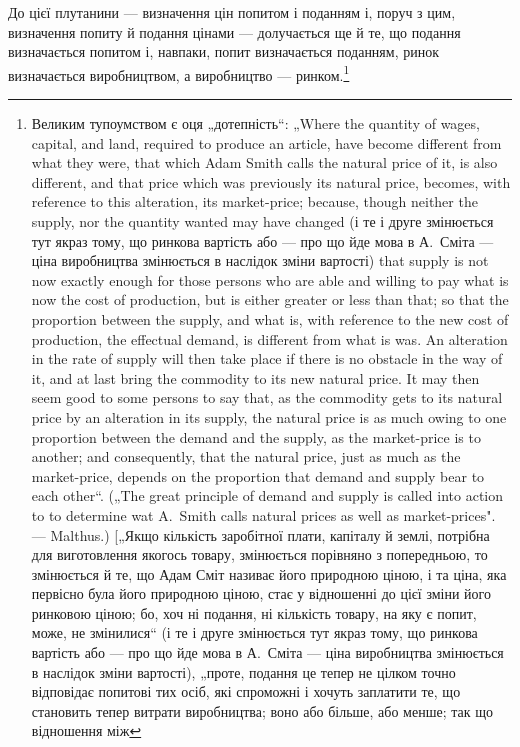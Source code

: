 До цієї плутанини — визначення цін попитом і поданням і,
поруч з цим, визначення попиту й подання цінами — долучається
ще й те, що подання визначається попитом і, навпаки,
попит визначається поданням, ринок визначається виробництвом,
а виробництво — ринком.\footnote{
Великим тупоумством є оця „дотепність“: „Where the quantity of wages,
capital, and land, required to produce an article, have become different from what
they were, that which Adam Smith calls the natural price of it, is also different,
and that price which was previously its natural price, becomes, with reference to
this alteration, its market-price; because, though neither the supply, nor the quantity
wanted may have changed (і те і друге змінюється тут якраз тому, що
ринкова вартість або — про що йде мова в А.~Сміта — ціна виробництва змінюється
в наслідок зміни вартості) that supply is not now exactly enough for
those persons who are able and willing to pay what is now the cost of production,
but is either greater or less than that; so that the proportion between the supply,
and what is, with reference to the new cost of production, the effectual demand,
is different from what is was. An alteration in the rate of supply will then take
place if there is no obstacle іn the way of it, and at last bring the commodity
to its new natural price. It may then seem good to some persons to say that, as
the commodity gets to its natural price by an alteration in its supply, the natural
price is as much owing to one proportion between the demand and the supply, as
the market-price is to another; and consequently, that the natural price, just as
much as the market-price, depends on the proportion that demand and supply
bear to each other“. („The great principle of demand and supply is called into
action to to determine wat A.~Smith calls natural prices as well as market-prices". —
Malthus.) [„Якщо кількість заробітної плати, капіталу й землі, потрібна для
виготовлення якогось товару, змінюється порівняно з попередньою, то змінюється
й те, що Адам Сміт називає його природною ціною, і та ціна, яка
первісно була його природною ціною, стає у відношенні до цієї зміни його
ринковою ціною; бо, хоч ні подання, ні кількість товару, на яку є попит,
може, не змінилися“ (і те і друге змінюється тут якраз тому, що ринкова
вартість або — про що йде мова в А.~Сміта — ціна виробництва змінюється
в наслідок зміни вартості), „проте, подання це тепер не цілком точно відповідає
попитові тих осіб, які спроможні і хочуть заплатити те, що становить тепер
витрати виробництва; воно або більше, або менше; так що відношення між
}
